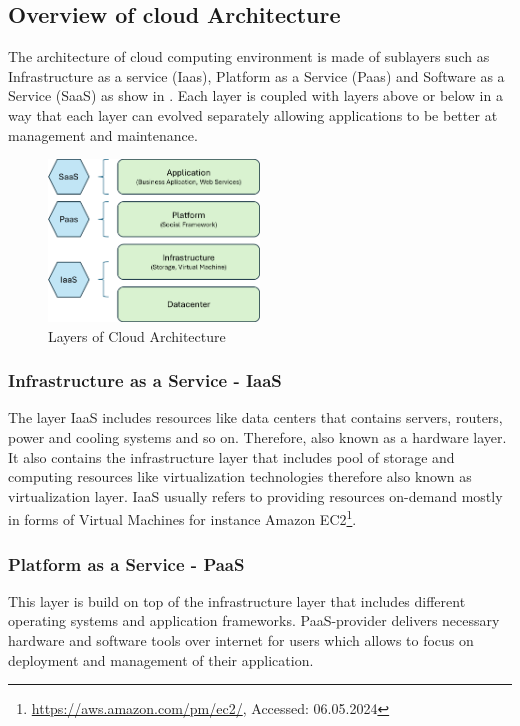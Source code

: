 \subsection{Overview of cloud Architecture}

The architecture of cloud computing environment is made of sublayers such as Infrastructure as a service (Iaas),  Platform as a Service (Paas) and Software as a Service (SaaS) as show in . Each layer is coupled with layers above or below in a way that each layer can evolved separately allowing applications to be better at management and maintenance. 

\begin{figure}[!ht]
    \centering
    \includegraphics[width=0.5\textwidth]{chapters/images/Cloud_Computing/Cloud_layers.png}
    \caption{Layers of Cloud Architecture}
    \label{fig:Layers_of_Cloud_Architecture}
\end{figure}

\subsubsection{Infrastructure as a Service - IaaS}
The layer IaaS includes resources like data centers that contains servers, routers, power and cooling systems and so on. Therefore, also known as a hardware layer. It also contains the infrastructure layer that includes pool of storage and computing resources like virtualization technologies therefore also known as virtualization layer. IaaS usually refers to providing resources on-demand mostly in forms of Virtual Machines for instance Amazon EC2\footnote{\url{https://aws.amazon.com/pm/ec2/}, Accessed: 06.05.2024}.

\subsubsection{Platform as a Service - PaaS}

This layer is build on top of the infrastructure layer that includes different operating systems and application frameworks. PaaS-provider delivers necessary hardware and software tools over internet for users which allows to focus on deployment and management of their application. 

